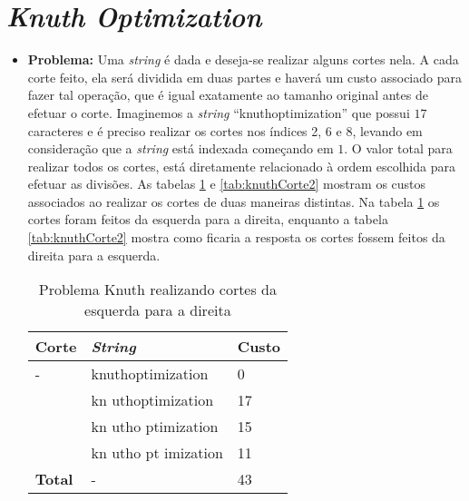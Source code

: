 \section{\textit{Knuth Optimization}}
\begin{itemize}[leftmargin=-.001in]
\item \textbf{Problema:}
Uma \textit{string} é dada e deseja-se realizar alguns cortes nela. A cada corte feito, ela será dividida em duas partes e haverá um custo associado para fazer tal operação, que é igual exatamente ao tamanho original antes de efetuar o corte. Imaginemos a \textit{string} \enquote{knuthoptimization} que possui $17$ caracteres e é preciso realizar os cortes nos índices 2, 6 e 8, levando em consideração que a \textit{string} está indexada começando em $1$.
O valor total para realizar todos os cortes, está diretamente relacionado à ordem escolhida para efetuar as divisões. As tabelas \ref{tab:knuthCorte} e \ref{tab:knuthCorte2} mostram os custos associados ao realizar os cortes de duas maneiras distintas. Na tabela \ref{tab:knuthCorte} os cortes foram feitos da esquerda para a direita, enquanto a tabela \ref{tab:knuthCorte2} mostra como ficaria a resposta os cortes fossem feitos da direita para a esquerda.

\begin{table}[H]
	\centering
	\caption[Problema Knuth realizando cortes da esquerda para a direita]{Problema Knuth realizando cortes da esquerda para a direita}
	\label{tab:knuthCorte}
	\begin{tabular}{p{3cm}|p{4cm}|p{3cm}}
		\hline \SPACE
		\textbf{Corte} & \textbf{\textit{String}} & \textbf{Custo} \\  \hline \SPACE
		- & knuthoptimization    &  0\\ \hline \SPACE
		2 & kn uthoptimization   &  17\\ \hline \SPACE
		6 & kn utho ptimization  &  15\\ \hline \SPACE
		8 & kn utho pt imization &  11\\ \hline \SPACE
		\textbf{Total}  & -   &  43 \\ \hline  
	\end{tabular} 	
\end{table}


\end{itemize}
